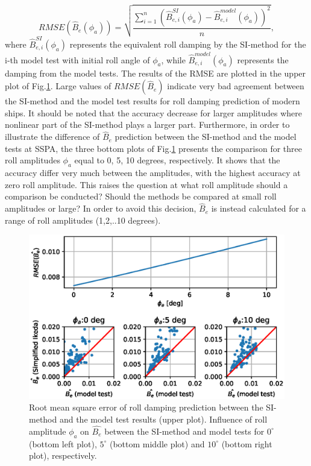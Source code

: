 \begin{equation} \label{eq:rmse}
    RMSE({\hat{B}_e} (\phi_a)) = \sqrt{\frac{\sum\limits_{i=1}^n (\hat{B}_{e,i}^{SI} (\phi_a) - \hat{B}_{e,i}^{model} (\phi_a))^2}{n}},
\end{equation}
where $\hat{B}_{e,i}^{SI} (\phi_a)$ represents the equivalent roll damping by the SI-method for the i-th model test with initial roll angle of $\phi_a$, while $\hat{B}_{e,i}^{model} (\phi_a)$ represents the damping from the model tests. The results of the RMSE are plotted in the upper plot of Fig.\ref{fig:ikeda_phi_a}. Large values of $RMSE({\hat{B}_e})$ indicate very bad agreement between the SI-method and the model test results for roll damping prediction of modern ships. It should be noted that the accuracy decrease for larger amplitudes where nonlinear part of the SI-method plays a larger part. Furthermore, in order to illustrate the difference of $\hat{B}_e$ prediction between the SI-method and the model tests at SSPA, the three bottom plots of Fig.\ref{fig:ikeda_phi_a} presents the comparison for three roll amplitudes $\phi_a$ equal to 0, 5, 10 degrees, respectively. It shows that the accuracy differ very much between the amplitudes, with the highest accuracy at zero roll amplitude. This raises the question at what roll amplitude should a comparison be conducted? Should the methods be compared at small roll amplitudes or large? In order to avoid this decision, $\hat{B}_e$ is instead calculated for a range of roll amplitudes (1,2,..10 degrees).   

\begin{figure}[H]
\centering
  \centering
  \includegraphics[]{figures/ikeda_phi_a.eps}
  \vspace{-0.5cm}
  \caption{Root mean square error of roll damping prediction between the SI-method and the model test results (upper plot). Influence of roll amplitude $\phi_a$ on $\hat{B_e}$ between the SI-method and model tests for $0^{\circ}$ (bottom left plot), $5^{\circ}$ (bottom middle plot) and $10^{\circ}$ (bottom right plot), respectively.}
  \label{fig:ikeda_phi_a}
\end{figure}

